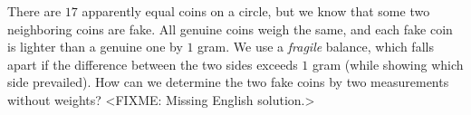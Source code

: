 \problem{}
There are $17$ apparently equal coins on a circle, but we know that some two
neighboring coins are fake.
All genuine coins weigh the same, and each fake coin is lighter than a genuine one by
$1$ gram.
We use a \emph{fragile} balance, which falls apart if the difference between the two
sides exceeds $1$ gram (while showing which side prevailed).
How can we determine the two fake coins by two measurements without weights?
\solution
<FIXME: Missing English solution.>
\endproblem
